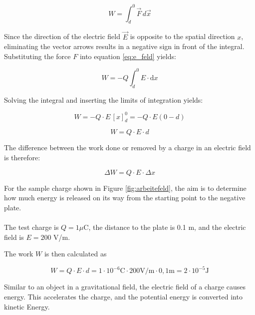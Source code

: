 \begin{frame}
{		
\begin{equation*}
	W = \int_{d}^{0}  \vec{F} \, d \vec{x} 
\end{equation*}

Since the direction of the electric field $\vec{E}$ is opposite to the spatial direction $x$,
eliminating the vector arrows results in a negative sign in front of the integral.
Substituting the force $F$ into equation \ref{eq:e_feld} yields:

\begin{equation*}
	W = - Q \int_{d}^{0} E \cdot \mathrm{d}x 
\end{equation*}

Solving the integral and inserting the limits of integration yields:

\begin{equation*}
	 W = -Q \cdot E \, [x]_d^0 = -Q \cdot E (0-d) 
\end{equation*} 

\begin{equation*}
	 W = Q \cdot E \cdot d
\end{equation*}

The difference between the work done or removed by a charge in an electric field is therefore:

\begin{equation}
	\Delta W = Q \cdot E \cdot \Delta x 
\end{equation}

\begin{expl}{}{}

	For the sample charge shown in Figure \ref{fig:arbeitefeld}, the aim is to determine how much energy is released on its way from the
	starting point to the negative plate.\\
\phantom{text}\\

	The test charge is $Q= 1 \mu \mathrm{C}$, the distance to the plate is 0.1 m, and the 
    electric field is $E= 200$ V/m.

	The work $W$ is then calculated as 

	\begin{equation*}
		W= Q \cdot E \cdot d = 1 \cdot 10^{-6} \mathrm{C} \cdot 200 \mathrm{V/m} \cdot 0,1 \mathrm{m} = 2 \cdot 10^{-5} \mathrm{J} 
	\end{equation*}
\end{expl}

Similar to an object in a gravitational field, the electric field of a charge causes energy.
This accelerates the charge, and the potential energy is converted into kinetic Energy.


}
\end{frame}
